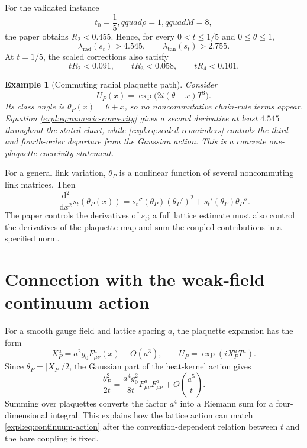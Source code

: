 \documentclass[11pt]{article}
\newtheorem{example}[principle]{Example}
\theoremstyle{definition}
\newcommand{\dd}{\,\mathrm{d}}
\begin{document}
For the validated instance
\[
 t_0=\frac15,qquad \rho=1,qquad M=8,
\]
the paper obtains $R_2<0.455$.  Hence, for every $0<t\le1/5$ and
$0\le\theta\le1$,
\begin{equation}\label{expl:eq:numeric-convexity}
 \lambda_{\mathrm{rad}}(s_t)>4.545,
 \qquad
 \lambda_{\mathrm{tan}}(s_t)>2.755.
\end{equation}
At $t=1/5$, the scaled corrections also satisfy
\begin{equation}\label{expl:eq:scaled-remainders}
 tR_2<0.091,
 \qquad tR_3<0.058,
 \qquad tR_4<0.101.
\end{equation}

\begin{example}[Commuting radial plaquette path]
Consider
\[
 U_P(x)=\exp\bigl(2i(\theta+x)T^3\bigr).
\]
Its class angle is $\theta_P(x)=\theta+x$, so no noncommutative chain-rule
terms appear.  Equation \eqref{expl:eq:numeric-convexity} gives a second
derivative at least $4.545$ throughout the stated chart, while
\eqref{expl:eq:scaled-remainders} controls the third- and fourth-order
departure from the Gaussian action.  This is a concrete one-plaquette
coercivity statement.
\end{example}

For a general link variation, $\theta_P$ is a nonlinear function of several
noncommuting link matrices.  Then
\begin{equation}\label{expl:eq:chain-rule}
 \frac{\dd^2}{\dd x^2}s_t(\theta_P(x))
 =s_t''(\theta_P)(\theta_P')^2+s_t'(\theta_P)\theta_P''.
\end{equation}
The paper controls the derivatives of $s_t$; a full lattice estimate must
also control the derivatives of the plaquette map and sum the coupled
contributions in a specified norm.

\section{Connection with the weak-field continuum action}

For a smooth gauge field and lattice spacing $a$, the plaquette expansion has
the form
\begin{equation}\label{expl:eq:plaquette-expansion}
 X_P^a=a^2g_0F_{\mu\nu}^a(x)+O(a^3),
 \qquad U_P=\exp(iX_P^aT^a).
\end{equation}
Since $\theta_P=|X_P|/2$, the Gaussian part of the heat-kernel action gives
\begin{equation}\label{expl:eq:continuum-match}
 \frac{\theta_P^2}{2t}
 =\frac{a^4g_0^2}{8t}F_{\mu\nu}^aF_{\mu\nu}^a
 +O\left(\frac{a^5}{t}\right).
\end{equation}
Summing over plaquettes converts the factor $a^4$ into a Riemann sum for a
four-dimensional integral.  This explains how the lattice action can match
\eqref{expl:eq:continuum-action} after the convention-dependent relation
between $t$ and the bare coupling is fixed.
\end{document}
